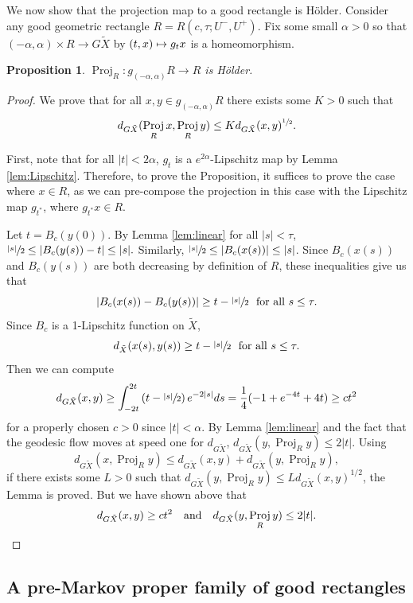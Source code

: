 \documentclass[JEP,XML,SOM,Unicode,NoFloatCountersInSection]{cedram}
\def\mto{\mathchoice{\longmapsto}{\mapsto}{\mapsto}{\mapsto}}
\newtheorem{prop}[thm]{Proposition}
\theoremstyle{definition}
\numberwithin{equation}{section}
\DeclareMathOperator{\Proj}{Proj}
\begin{document}
We now show that the projection map to a good rectangle is Hölder. Consider any good geometric rectangle $R=R(c,\tau; U^-, U^+)$. Fix some small $\alpha>0$ so that $(-\alpha, \alpha) \times R \to G\tilde X$ by $(t,x) \mto g_t x$ is a homeomorphism.

\begin{prop} \label{projholder}
$\Proj_R:g_{(-\alpha, \alpha)}R \to R$ is Hölder.
\end{prop}

\begin{proof}
We prove that for all $x,y\in g_{(-\alpha, \alpha)}R$ there exists some $K>0$ such that
\[ d_{G\tilde X} (\Proj_Rx, \Proj_Ry) \leq K d_{G\tilde X}(x,y)^{\sfrac{1}{2}}.\]

First, note that for all $|t|<2\alpha$, $g_t$ is a $e^{2\alpha}$-Lipschitz map by Lemma \ref{lem:Lipschitz}. Therefore, to prove the Proposition, it suffices to prove the case where $x\in R$, as we can pre-compose the projection in this case with the Lipschitz map $g_{t^*}$, where $g_{t^*}x\in R$.

Let $t=B_c(y(0))$. By Lemma \ref{lem:linear} for all $|s|<\tau$, $\sfrac{|s|}{2} \leq |B_c(y(s))-t| \leq |s|.$ Similarly, $\sfrac{|s|}{2} \leq |B_c(x(s))| \leq |s|$. Since $B_c(x(s))$ and $B_c(y(s))$ are both decreasing by definition of $R$, these inequalities give us that
\[ |B_c(x(s)) - B_c(y(s))| \geq t-\sfrac{|s|}{2} \ \mbox{ for all } s\leq \tau.\]
Since $B_c$ is a 1-Lipschitz function on $\tilde X$,
\[ d_{\tilde X}(x(s), y(s)) \geq t-\sfrac{|s|}{2} \ \mbox{ for all } s\leq \tau. \]
Then we can compute
\[ d_{G\tilde X}(x,y) \geq \int_{-2t}^{2t} \left(t-\sfrac{|s|}{2}\right) e^{-2|s|} ds = \frac{1}{4}(-1+e^{-4t}+4t) \geq c t^2\]
for a properly chosen $c>0$ since $|t|<\alpha$. By Lemma \ref{lem:linear} and the fact that the geodesic flow moves at speed one for $d_{G\tilde X}$, $d_{G\tilde X}(y,\Proj_Ry) \leq 2|t|$. Using
\[
d_{G\tilde X}(x, \Proj_Ry) \leq d_{G\tilde X}(x,y) + d_{G\tilde X}(y,\Proj_Ry),
\]
if there exists some $L>0$ such that $d_{G\tilde X}(y,\Proj_Ry) \leq Ld_{G\tilde X}(x,y)^{1/2}$, the Lemma is proved. But we have shown above that
\[
d_{G\tilde X}(x,y) \geq ct^2\quad\text{and}\quad d_{G\tilde X} (y, \Proj_Ry)\leq 2|t|.\qedhere
\]
\end{proof}

\subsection{A pre-Markov proper family of good rectangles}\label{sec:good markov}
\end{document}
